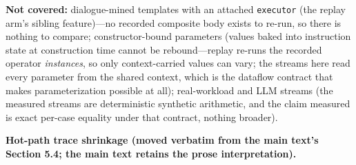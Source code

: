 \documentclass[
  11pt,
]{article}
\begin{document}
\textbf{Not covered:} dialogue-mined templates with an attached
\texttt{executor} (the replay arm's sibling feature)---no recorded
composite body exists to re-run, so there is nothing to compare;
constructor-bound parameters (values baked into instruction state at
construction time cannot be rebound---replay re-runs the recorded
operator \emph{instances}, so only context-carried values can vary; the
streams here read every parameter from the shared context, which is the
dataflow contract that makes parameterization possible at all);
real-workload and LLM streams (the measured streams are deterministic
synthetic arithmetic, and the claim measured is exact per-case equality
under that contract, nothing broader).

\textbf{Hot-path trace shrinkage (moved verbatim from the main text's
Section 5.4; the main text retains the prose interpretation).}
\end{document}
